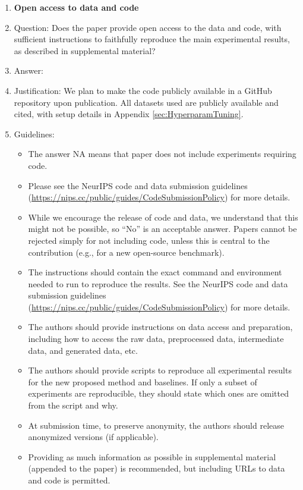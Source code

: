 \documentclass{article}
\theoremstyle{remark}
\begin{document}
\begin{enumerate}
\item {\bf Open access to data and code}
    \item[] Question: Does the paper provide open access to the data and code, with sufficient instructions to faithfully reproduce the main experimental results, as described in supplemental material?
    \item[] Answer: \answerYes{} %
    \item[] Justification: We plan to make the code publicly available in a GitHub repository upon publication. All datasets used are publicly available and cited, with setup details in Appendix \ref{sec:HyperparamTuning}.
    \item[] Guidelines:
    \begin{itemize}
        \item The answer NA means that paper does not include experiments requiring code.
        \item Please see the NeurIPS code and data submission guidelines (\url{https://nips.cc/public/guides/CodeSubmissionPolicy}) for more details.
        \item While we encourage the release of code and data, we understand that this might not be possible, so “No” is an acceptable answer. Papers cannot be rejected simply for not including code, unless this is central to the contribution (e.g., for a new open-source benchmark).
        \item The instructions should contain the exact command and environment needed to run to reproduce the results. See the NeurIPS code and data submission guidelines (\url{https://nips.cc/public/guides/CodeSubmissionPolicy}) for more details.
        \item The authors should provide instructions on data access and preparation, including how to access the raw data, preprocessed data, intermediate data, and generated data, etc.
        \item The authors should provide scripts to reproduce all experimental results for the new proposed method and baselines. If only a subset of experiments are reproducible, they should state which ones are omitted from the script and why.
        \item At submission time, to preserve anonymity, the authors should release anonymized versions (if applicable).
        \item Providing as much information as possible in supplemental material (appended to the paper) is recommended, but including URLs to data and code is permitted.
    \end{itemize}



\end{enumerate}
\end{document}
